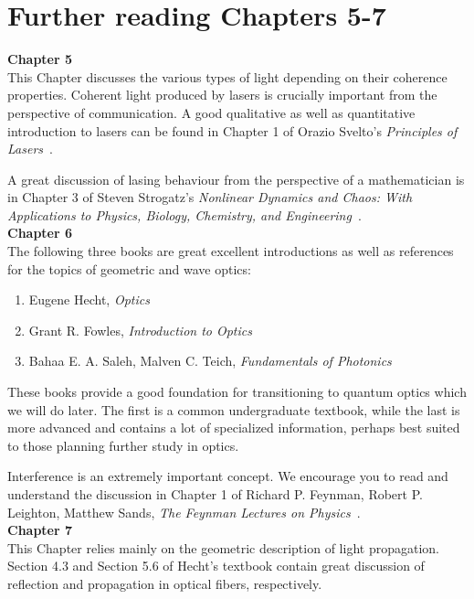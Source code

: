 \section*{Further reading Chapters 5-7}

{\bf Chapter 5}\\

This Chapter discusses the various types of light depending on their coherence properties. Coherent light produced by lasers is crucially important from the perspective of communication. A good qualitative as well as quantitative introduction to lasers can be found in Chapter 1 of Orazio Svelto's \emph{Principles of Lasers}~\cite{svelto2010principles}.

A great discussion of lasing behaviour from the perspective of a mathematician is in Chapter 3 of Steven Strogatz's \emph{Nonlinear Dynamics and Chaos: With Applications to Physics, Biology, Chemistry, and Engineering}~\cite{strogatz2018nonlinear}.\\

{\bf Chapter 6}\\

The following three books are great excellent introductions as well as references for the topics of geometric and wave optics:
\begin{enumerate}
    \item Eugene Hecht, \emph{Optics}~\cite{hecht2012optics}
    \item Grant R. Fowles, \emph{Introduction to Optics}~\cite{fowles1989introduction}
    \item Bahaa E. A. Saleh, Malven C. Teich, \emph{Fundamentals of Photonics}~\cite{saleh2019fundamentals}
\end{enumerate}

These books provide a good foundation for transitioning to quantum optics which we will do later.
The first is a common undergraduate textbook, while the last is more advanced and contains a lot of specialized information, perhaps best suited to those planning further study in optics.

Interference is an extremely important concept.
We encourage you to read and understand the discussion in Chapter 1 of
Richard P. Feynman, Robert P. Leighton, Matthew Sands, \emph{The Feynman Lectures on Physics}~\cite{feynman1971feynman}.\\

{\bf Chapter 7}\\

This Chapter relies mainly on the geometric description of light propagation. Section 4.3 and Section 5.6 of Hecht’s textbook contain great discussion of reflection and propagation in optical fibers, respectively.
